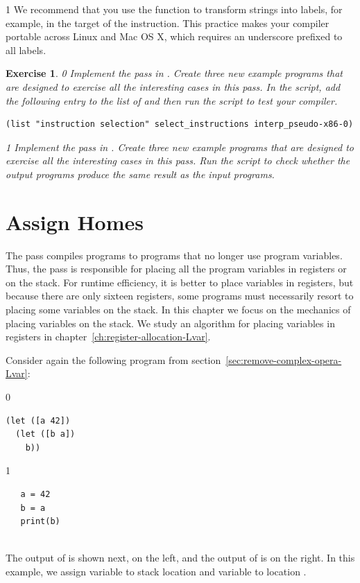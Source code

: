 \documentclass[7x10]{TimesAPriori_MIT}%
\def\racketEd{0}
\def\pythonEd{1}
\providecommand{\BookEdition}{1}
\let\edition\BookEdition
\newcommand{\pythonColor}[0]{}
\newtheorem{exercise}[theorem]{Exercise}
\numberwithin{theorem}{chapter}
\numberwithin{definition}{chapter}
\numberwithin{equation}{chapter}
\begin{document}
{\if\edition\pythonEd\pythonColor
We recommend that you use the function  to
transform strings into labels, for example, in
the target of the  instruction. This practice makes your
compiler portable across Linux and Mac OS X, which requires an underscore
prefixed to all labels.
\fi}
\begin{exercise}
  \normalfont\normalsize
{\if\edition\racketEd
Implement the  pass in
. Create three new example programs that are
designed to exercise all the interesting cases in this pass.
%
In the  script, add the following entry to the
list of  and then run the script to test your compiler.
\begin{lstlisting}
(list "instruction selection" select_instructions interp_pseudo-x86-0)
\end{lstlisting}
\fi}
{\if\edition\pythonEd\pythonColor
Implement the  pass in
. Create three new example programs that are
designed to exercise all the interesting cases in this pass.
Run the  script to check
whether the output programs produce the same result as the input
programs.
\fi}
\end{exercise}


\section{Assign Homes}
\label{sec:assign-Lvar}

The  pass compiles \LangXVar{} programs to
\LangXVar{} programs that no longer use program variables.  Thus, the
 pass is responsible for placing all the program
variables in registers or on the stack. For runtime efficiency, it is
better to place variables in registers, but because there are only
sixteen registers, some programs must necessarily resort to placing
some variables on the stack. In this chapter we focus on the mechanics
of placing variables on the stack. We study an algorithm for placing
variables in registers in chapter~\ref{ch:register-allocation-Lvar}.

Consider again the following \LangVar{} program from
section~\ref{sec:remove-complex-opera-Lvar}:\\
\begin{minipage}{0.96\textwidth}
{\if\edition\racketEd
\begin{lstlisting}
(let ([a 42])
  (let ([b a])
    b))
\end{lstlisting}
\fi}
{\if\edition\pythonEd\pythonColor
\begin{lstlisting}
   a = 42
   b = a
   print(b)
\end{lstlisting}
\fi}
\end{minipage}\\
%
The output of  is shown next, on the left,
and the output of  is on the right.
In this example, we assign variable  to stack location
   and variable  to location .
\end{document}
